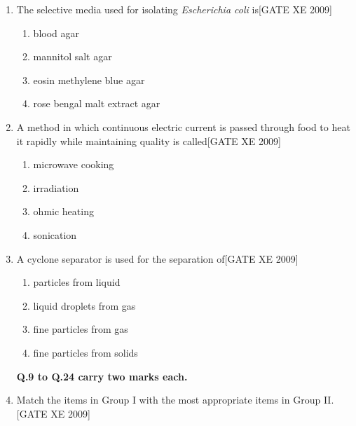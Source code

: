 \documentclass[journal,12pt,onecolumn]{IEEEtran}
\theoremstyle{remark}
\begin{document}
\begin{enumerate}
\begin{enumerate}
\begin{enumerate}[label=\textbf{Q.\arabic*.}, wide=0pt, leftmargin=*]
\item The selective media used for isolating \textit{Escherichia coli} is\hfill[GATE XE 2009]
\begin{multicols}{2}
\begin{enumerate}
\item blood agar
\item mannitol salt agar
\item eosin methylene blue agar
\item rose bengal malt extract agar
\end{enumerate}
\end{multicols}

\item A method in which continuous electric current is passed through food to heat it rapidly while maintaining quality is called\hfill[GATE XE 2009]
\begin{multicols}{2}
\begin{enumerate}
\item microwave cooking
\item irradiation
\item ohmic heating
\item sonication
\end{enumerate}
\end{multicols}

\item A cyclone separator is used for the separation of\hfill[GATE XE 2009]
\begin{multicols}{2}
\begin{enumerate}
\item particles from liquid
\item liquid droplets from gas
\item fine particles from gas
\item fine particles from solids
\end{enumerate}
\end{multicols}
\noindent \textbf{Q.9 to Q.24 carry two marks each.}



\item Match the items in Group I with the most appropriate items in Group II.\hfill[GATE XE 2009]


\end{enumerate}
\end{enumerate}
\end{enumerate}
\end{document}

